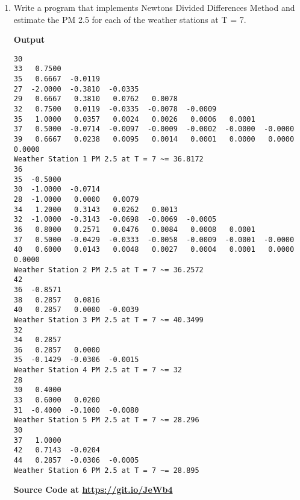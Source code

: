 \documentclass{exam}
\begin{document}
\begin{enumerate}
\begin{verbatim}
27  27.0000  27.0000  27.0000
29  27.0000  27.0000  27.0000  27.0000
32  26.7500  27.0000  27.0000  27.0000  27.0000
35  25.0000  27.5000  27.0000  27.0000  27.0000  27.0000
37  30.0000  20.0000  29.5455  27.0000  27.0000  27.0000  27.0000
39  27.6667  33.3333  10.6667  33.5909  27.0000  27.0000  27.0000  27.0000
Weather Station 1 PM 2.5 at T = 12 ~= 27
36
35  31.0000
30  27.0000  25.2857
28  27.0000  27.0000  27.1905
34  29.2000  27.9429  27.6286  27.5034
32  38.0000  30.4571  28.7810  28.2871  27.9932
36  27.2000  44.1714  31.6000  29.3850  28.7494  28.3533
37  30.5000  24.3714  52.9714  33.1265  30.0866  29.2588  28.7470
40  29.2000  32.5429  20.2857  62.3102  34.6625  30.7403  29.7146  29.0926
Weather Station 2 PM 2.5 at T = 12 ~= 29.0926
42
36  36.8571
38  35.7143  36.3673
40  35.7143  35.7143  36.1808
Weather Station 3 PM 2.5 at T = 12 ~= 36.1808
32
34  33.4286
36  33.4286  33.4286
35  37.2857  32.8776  33.2974
Weather Station 4 PM 2.5 at T = 12 ~= 33.2974
28
30  30.8000
33  31.2000  31.0800
31  34.2000  31.8000  31.4160
Weather Station 5 PM 2.5 at T = 12 ~= 31.416
30
37  34.0000
42  34.8571  34.2449
44  39.1429  33.9388  34.1866
Weather Station 6 PM 2.5 at T = 12 ~= 34.1866
    \end{verbatim}
    \begin{center}
        \textbf{Source Code at \url{https://git.io/JeWb4}}
    \end{center}
	\item  Write  a  program  that  implements  Newtons  Divided  Differences  Method  and estimate the PM 2.5 for each of the weather stations at T = 7.
    \begin{center}
        \textbf{Output}
    \end{center}
    \begin{verbatim}
30
33   0.7500
35   0.6667  -0.0119
27  -2.0000  -0.3810  -0.0335
29   0.6667   0.3810   0.0762   0.0078
32   0.7500   0.0119  -0.0335  -0.0078  -0.0009
35   1.0000   0.0357   0.0024   0.0026   0.0006   0.0001
37   0.5000  -0.0714  -0.0097  -0.0009  -0.0002  -0.0000  -0.0000
39   0.6667   0.0238   0.0095   0.0014   0.0001   0.0000   0.0000   0.0000
Weather Station 1 PM 2.5 at T = 7 ~= 36.8172
36
35  -0.5000
30  -1.0000  -0.0714
28  -1.0000   0.0000   0.0079
34   1.2000   0.3143   0.0262   0.0013
32  -1.0000  -0.3143  -0.0698  -0.0069  -0.0005
36   0.8000   0.2571   0.0476   0.0084   0.0008   0.0001
37   0.5000  -0.0429  -0.0333  -0.0058  -0.0009  -0.0001  -0.0000
40   0.6000   0.0143   0.0048   0.0027   0.0004   0.0001   0.0000   0.0000
Weather Station 2 PM 2.5 at T = 7 ~= 36.2572
42
36  -0.8571
38   0.2857   0.0816
40   0.2857   0.0000  -0.0039
Weather Station 3 PM 2.5 at T = 7 ~= 40.3499
32
34   0.2857
36   0.2857   0.0000
35  -0.1429  -0.0306  -0.0015
Weather Station 4 PM 2.5 at T = 7 ~= 32
28
30   0.4000
33   0.6000   0.0200
31  -0.4000  -0.1000  -0.0080
Weather Station 5 PM 2.5 at T = 7 ~= 28.296
30
37   1.0000
42   0.7143  -0.0204
44   0.2857  -0.0306  -0.0005
Weather Station 6 PM 2.5 at T = 7 ~= 28.895
    \end{verbatim}
    \begin{center}
        \textbf{Source Code at \url{https://git.io/JeWb4}}
    \end{center}
\end{enumerate}
\end{document}
